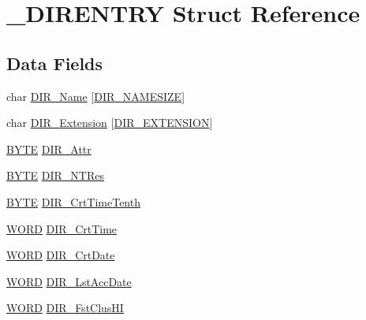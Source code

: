 \hypertarget{struct___d_i_r_e_n_t_r_y}{}\section{\+\_\+\+D\+I\+R\+E\+N\+T\+R\+Y Struct Reference}
\label{struct___d_i_r_e_n_t_r_y}
\subsection*{Data Fields}
\begin{DoxyCompactItemize}
\item 
char \hyperlink{struct___d_i_r_e_n_t_r_y_a25902ff47f9dd1672c00655fdf823a1e}{D\+I\+R\+\_\+\+Name} \mbox{[}\hyperlink{_f_s_defs_8h_a589d45fc5813fc59c465e69cceb045e0}{D\+I\+R\+\_\+\+N\+A\+M\+E\+S\+I\+Z\+E}\mbox{]}
\item 
char \hyperlink{struct___d_i_r_e_n_t_r_y_a50e85f8c7004ed15f0f126c62e9947b1}{D\+I\+R\+\_\+\+Extension} \mbox{[}\hyperlink{_f_s_defs_8h_afa5e11b1685957a01b5e780a42b7cab9}{D\+I\+R\+\_\+\+E\+X\+T\+E\+N\+S\+I\+O\+N}\mbox{]}
\item 
\hyperlink{_generic_type_defs_8h_a4ae1dab0fb4b072a66584546209e7d58}{B\+Y\+T\+E} \hyperlink{struct___d_i_r_e_n_t_r_y_a135fb39a2f8df21153b95046f758aed4}{D\+I\+R\+\_\+\+Attr}
\item 
\hyperlink{_generic_type_defs_8h_a4ae1dab0fb4b072a66584546209e7d58}{B\+Y\+T\+E} \hyperlink{struct___d_i_r_e_n_t_r_y_af8459a5d4b4d16f55fed52d6e964a426}{D\+I\+R\+\_\+\+N\+T\+Res}
\item 
\hyperlink{_generic_type_defs_8h_a4ae1dab0fb4b072a66584546209e7d58}{B\+Y\+T\+E} \hyperlink{struct___d_i_r_e_n_t_r_y_a2dbef950992bb9e3796112b2fc442365}{D\+I\+R\+\_\+\+Crt\+Time\+Tenth}
\item 
\hyperlink{_generic_type_defs_8h_a2b0e863dadf920709ec53d9088ee7c91}{W\+O\+R\+D} \hyperlink{struct___d_i_r_e_n_t_r_y_ae81c6adf07fde67ea9c31e4ca904fe9c}{D\+I\+R\+\_\+\+Crt\+Time}
\item 
\hyperlink{_generic_type_defs_8h_a2b0e863dadf920709ec53d9088ee7c91}{W\+O\+R\+D} \hyperlink{struct___d_i_r_e_n_t_r_y_a0c839078c5efd521c5932fc5265e801f}{D\+I\+R\+\_\+\+Crt\+Date}
\item 
\hyperlink{_generic_type_defs_8h_a2b0e863dadf920709ec53d9088ee7c91}{W\+O\+R\+D} \hyperlink{struct___d_i_r_e_n_t_r_y_a122788ca7738b059f3eb21b52b17b96c}{D\+I\+R\+\_\+\+Lst\+Acc\+Date}
\item 
\hyperlink{_generic_type_defs_8h_a2b0e863dadf920709ec53d9088ee7c91}{W\+O\+R\+D} \hyperlink{struct___d_i_r_e_n_t_r_y_a395f6331221fdf7040aec9292d90bb0f}{D\+I\+R\+\_\+\+Fst\+Clus\+H\+I}

\end{DoxyCompactItemize}
